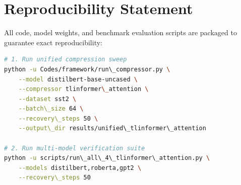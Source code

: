 \section{Reproducibility Statement}
All code, model weights, and benchmark evaluation scripts are packaged to guarantee exact reproducibility:
\begin{lstlisting}[language=bash]
# 1. Run unified compression sweep
python -u Codes/framework/run\_compressor.py \
    --model distilbert-base-uncased \
    --compressor tlinformer\_attention \
    --dataset sst2 \
    --batch\_size 64 \
    --recovery\_steps 50 \
    --output\_dir results/unified\_tlinformer\_attention

# 2. Run multi-model verification suite
python -u scripts/run\_all\_4\_tlinformer\_attention.py \
    --models distilbert,roberta,gpt2 \
    --recovery\_steps 50
\end{lstlisting}
